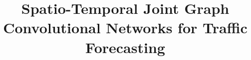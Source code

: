 \documentclass[10pt,journal,compsoc]{IEEEtran}
\begin{document}
%
\title{Spatio-Temporal Joint Graph Convolutional Networks for Traffic Forecasting}
%
%
%
%
\end{document}
